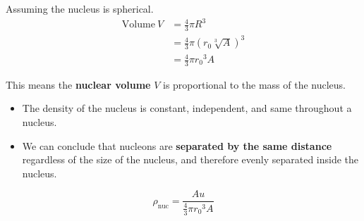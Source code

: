 Assuming the nucleus is spherical.
\begin{align*}
    \text{Volume}\ V&=\frac{4}{3}\pi R^3\\
                    &=\frac{4}{3}\pi(r_0\sqrt[3]{A})^3\\
                    &=\frac{4}{3}\pi {r_0}^3A
\end{align*}

This means the \textbf{nuclear volume} $V$ is proportional to the mass of the nucleus.
\begin{itemize}
    \item The density of the nucleus is constant, independent, and same throughout a nucleus.
    \item We can conclude that nucleons are \textbf{separated by the same distance} regardless of the size of the nucleus, and therefore evenly separated inside the nucleus.
\end{itemize}
$$\rho_\text{nuc}=\frac{Au}{\frac{4}{3}\pi {r_0}^3A}$$
